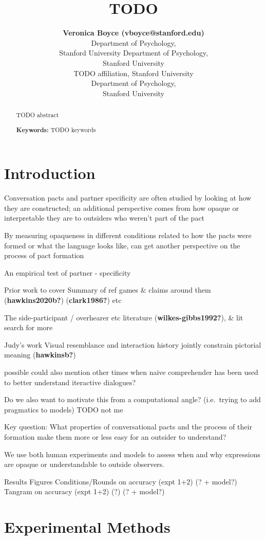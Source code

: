 \documentclass[10pt, letterpaper]{article}
\title{TODO}
\author{{\large \bf Veronica Boyce (vboyce@stanford.edu)} \\ Department of Psychology, \\Stanford University \And {\large \bf TODO (TODO email) } Department of Psychology, \\Stanford University \AND {\large \bf TODO (TODO email)} \\ TODO affiliation, Stanford University \And {\large \bf Michael C. Frank (mcfrank@stanford.edu)} \\ Department of Psychology, \\ Stanford University}
\begin{document}
\maketitle

\begin{abstract}
TODO abstract

\textbf{Keywords:}
TODO keywords
\end{abstract}

\section{Introduction}\label{introduction}

Conversation pacts and partner specificity are often studied by looking
at how they are constructed; an additional perspective comes from how
opaque or interpretable they are to outsiders who weren't part of the
pact

By measuring opaqueness in different conditions related to how the pacts
were formed or what the language looks like, can get another perspective
on the process of pact formation

An empirical test of partner - specificity

Prior work to cover Summary of ref games \& claims around them
(\textbf{hawkins2020b?}) (\textbf{clark1986?}) etc

The side-participant / overhearer etc literature
(\textbf{wilkes-gibbs1992?}), \& lit search for more

Judy's work Visual resemblance and interaction history jointly constrain
pictorial meaning (\textbf{hawkinsb?})

possible could also mention other times when naive comprehender has been
used to better understand iteractive dialogues?

Do we also want to motivate this from a computational angle?
(i.e.~trying to add pragmatics to models) TODO not me

Key question: What properties of conversational pacts and the process of
their formation make them more or less easy for an outsider to
understand?

We use both human experiments and models to assess when and why
expressions are opaque or understandable to outside observers.

Results Figures Conditions/Rounds on accuracy (expt 1+2) (? + model?)
Tangram on accuracy (expt 1+2) (?) (? + model?)

\section{Experimental Methods}\label{experimental-methods}
\end{document}
